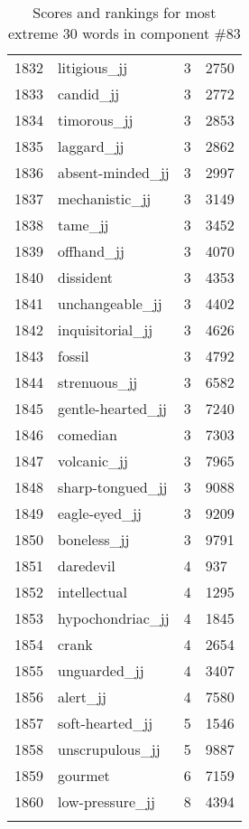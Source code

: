 \begin{longtable}[!htbp]{| rlr@{.}l |}
    1832 & litigious\_jj & 3 & 2750 \\
    1833 & candid\_jj & 3 & 2772 \\
    1834 & timorous\_jj & 3 & 2853 \\
    1835 & laggard\_jj & 3 & 2862 \\
    1836 & absent-minded\_jj & 3 & 2997 \\
    1837 & mechanistic\_jj & 3 & 3149 \\
    1838 & tame\_jj & 3 & 3452 \\
    1839 & offhand\_jj & 3 & 4070 \\
    1840 & dissident & 3 & 4353 \\
    1841 & unchangeable\_jj & 3 & 4402 \\
    1842 & inquisitorial\_jj & 3 & 4626 \\
    1843 & fossil & 3 & 4792 \\
    1844 & strenuous\_jj & 3 & 6582 \\
    1845 & gentle-hearted\_jj & 3 & 7240 \\
    1846 & comedian & 3 & 7303 \\
    1847 & volcanic\_jj & 3 & 7965 \\
    1848 & sharp-tongued\_jj & 3 & 9088 \\
    1849 & eagle-eyed\_jj & 3 & 9209 \\
    1850 & boneless\_jj & 3 & 9791 \\
    1851 & daredevil & 4 & 937 \\
    1852 & intellectual & 4 & 1295 \\
    1853 & hypochondriac\_jj & 4 & 1845 \\
    1854 & crank & 4 & 2654 \\
    1855 & unguarded\_jj & 4 & 3407 \\
    1856 & alert\_jj & 4 & 7580 \\
    1857 & soft-hearted\_jj & 5 & 1546 \\
    1858 & unscrupulous\_jj & 5 & 9887 \\
    1859 & gourmet & 6 & 7159 \\
    1860 & low-pressure\_jj & 8 & 4394 \\
    \hline
    \caption{Scores and rankings for most extreme 30 words in component \#83} \\
\end{longtable}

